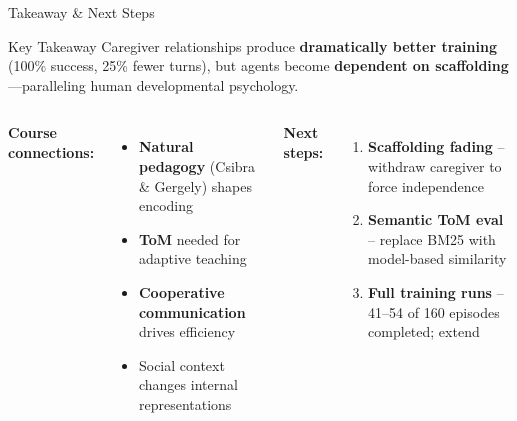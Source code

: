 \documentclass[aspectratio=169, 11pt]{beamer}
\begin{document}
\begin{frame}{Takeaway \& Next Steps}

\begin{exampleblock}{Key Takeaway}
Caregiver relationships produce \textbf{dramatically better training} (100\% success, 25\% fewer turns), but agents become \textbf{dependent on scaffolding}---paralleling human developmental psychology.
\end{exampleblock}

\vspace{0.3em}
\begin{columns}[T]
\textbf{Course connections:}
\begin{itemize}
    \footnotesize
    \item \textbf{Natural pedagogy} (Csibra \& Gergely) shapes encoding
    \item \textbf{ToM} needed for adaptive teaching
    \item \textbf{Cooperative communication} drives efficiency
    \item Social context changes internal representations
\end{itemize}

\textbf{Next steps:}
\begin{enumerate}
    \footnotesize
    \item \textbf{Scaffolding fading} -- withdraw caregiver to force independence
    \item \textbf{Semantic ToM eval} -- replace BM25 with model-based similarity
    \item \textbf{Full training runs} -- 41--54 of 160 episodes completed; extend
\end{enumerate}
\end{columns}

\end{frame}
\end{document}
